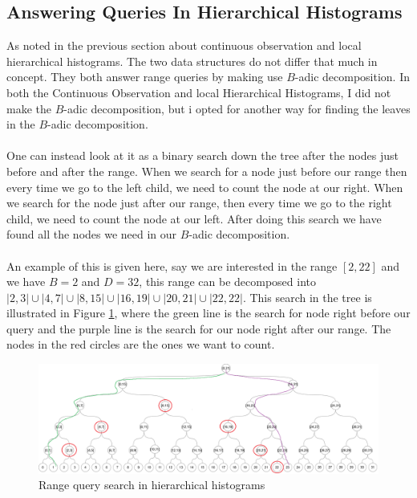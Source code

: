 \documentclass[11pt]{article}
\theoremstyle{definition}
\begin{document}
\subsection{Answering Queries In Hierarchical Histograms}\label{decom}
As noted in the previous section about continuous observation and local hierarchical histograms. The two data structures do not differ that much in concept. They both answer range queries by making use $B$-adic decomposition. In both the Continuous Observation and local Hierarchical Histograms, I did not make the $B$-adic decomposition, but i opted for another way for finding the leaves in the $B$-adic decomposition. \\ \\
One can instead look at it as a binary search down the tree after the nodes just before and after the range. When we search for a node just before our range then every time we go to the left child, we need to count the node at our right. When we search for the node just after our range, then every time we go to the right child, we need to count the node at our left. After doing this search we have found all the nodes we need in our $B$-adic decomposition.\\ \\
An example of this is given here, say we are interested in the range $[2,22]$ and we have $B=2$ and $D=32$, this range can be decomposed into $|2,3| \cup|4,7| \cup|8,15| \cup|16,19| \cup|20,21| \cup|22,22|$. This search in the tree is illustrated in Figure \ref{fig:disjoint_se_1}, where the green line is the search for node right before our query and the purple line is the search for our node right after our range. The nodes in the red circles are the ones we want to count. 
\begin{figure}[H]
    \centering
    \includegraphics[width=.8\linewidth]{figures/disjoint_search_1.png}
    \caption{Range query search in hierarchical histograms}
    \label{fig:disjoint_se_1}
\end{figure}
\end{document}
